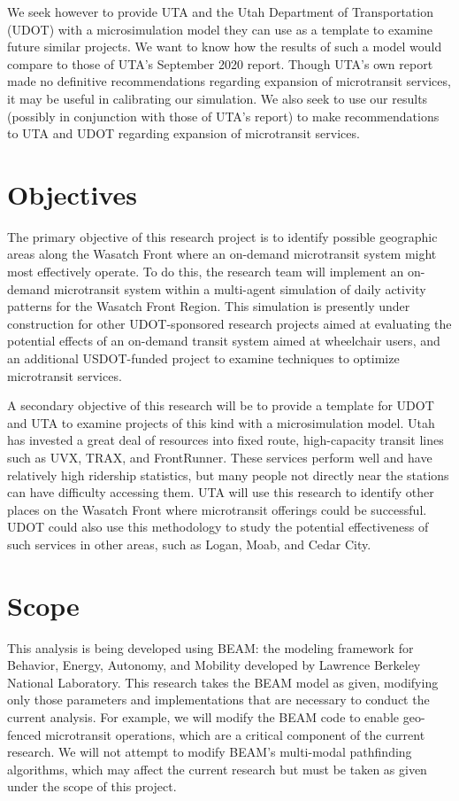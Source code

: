 \documentclass[
]{report}
\begin{document}
We seek however to provide UTA and the Utah Department of Transportation (UDOT) with a microsimulation model they can use as a template to examine future similar projects. We want to know how the results of such a model would compare to those of UTA's September 2020 report. Though UTA's own report made no definitive recommendations regarding expansion of microtransit services, it may be useful in calibrating our simulation. We also seek to use our results (possibly in conjunction with those of UTA's report) to make recommendations to UTA and UDOT regarding expansion of microtransit services.

\hypertarget{objectives}{%
\section{Objectives}\label{objectives}}

The primary objective of this research project is to identify possible geographic areas along the Wasatch Front where an on-demand microtransit system might most effectively operate. To do this, the research team will implement an on-demand microtransit system within a multi-agent simulation of daily activity patterns for the Wasatch Front Region. This simulation is presently under construction for other UDOT-sponsored research projects aimed at evaluating the potential effects of an on-demand transit system aimed at wheelchair users, and an additional USDOT-funded project to examine techniques to optimize microtransit services.

A secondary objective of this research will be to provide a template for UDOT and UTA to examine projects of this kind with a microsimulation model. Utah has invested a great deal of resources into fixed route, high-capacity transit lines such as UVX, TRAX, and FrontRunner. These services perform well and have relatively high ridership statistics, but many people not directly near the stations can have difficulty accessing them. UTA will use this research to identify other places on the Wasatch Front where microtransit offerings could be successful. UDOT could also use this methodology to study the potential effectiveness of such services in other areas, such as Logan, Moab, and Cedar City.

\hypertarget{scope}{%
\section{Scope}\label{scope}}

This analysis is being developed using BEAM: the modeling framework for Behavior, Energy, Autonomy, and Mobility developed by Lawrence Berkeley National Laboratory. This research takes the BEAM model as given, modifying only those parameters and implementations that are necessary to conduct the current analysis. For example, we will modify the BEAM code to enable geo-fenced microtransit operations, which are a critical component of the current research. We will not attempt to modify BEAM's multi-modal pathfinding algorithms, which may affect the current research but must be taken as given under the scope of this project.
\end{document}
